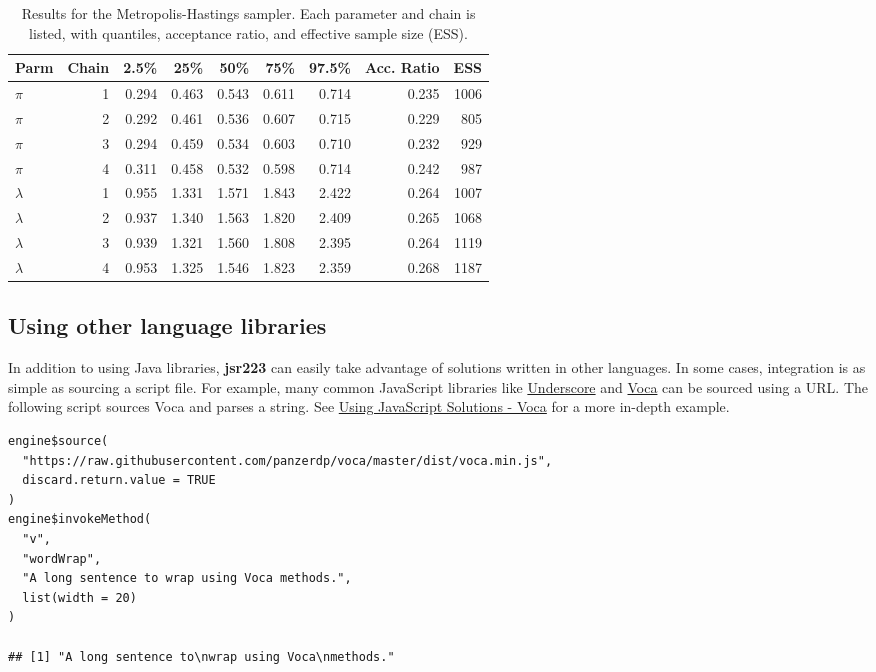 \documentclass[
article,
11pt, %
a4paper, %
oneside, %
headinclude,footinclude, %
]{scrartcl}
\theoremstyle{definition} %
\theoremstyle{plain} %
\theoremstyle{remark} %
\newcommand{\pkg}[1]{\textbf{#1}}
\begin{document}
\begin{table}[h]
\centering
\caption{Results for the Metropolis-Hastings sampler. Each parameter and chain is listed, with quantiles, acceptance ratio, and effective sample size (ESS).}
\label{tab:mcmcx}
\begin{tabular}{lrrrrrrrr}
\hline
Parm & Chain & 2.5\% & 25\% & 50\% & 75\% & 97.5\% & Acc. Ratio & ESS \\ 
\hline
$\pi$ &    1 & 0.294 & 0.463 & 0.543 & 0.611 & 0.714 & 0.235 & 1006 \\ 
$\pi$ &    2 & 0.292 & 0.461 & 0.536 & 0.607 & 0.715 & 0.229 &  805 \\ 
$\pi$ &    3 & 0.294 & 0.459 & 0.534 & 0.603 & 0.710 & 0.232 &  929 \\ 
$\pi$ &    4 & 0.311 & 0.458 & 0.532 & 0.598 & 0.714 & 0.242 &  987 \\ 
$\lambda$ &    1 & 0.955 & 1.331 & 1.571 & 1.843 & 2.422 & 0.264 & 1007 \\ 
$\lambda$ &    2 & 0.937 & 1.340 & 1.563 & 1.820 & 2.409 & 0.265 & 1068 \\ 
$\lambda$ &    3 & 0.939 & 1.321 & 1.560 & 1.808 & 2.395 & 0.264 & 1119 \\ 
$\lambda$ &    4 & 0.953 & 1.325 & 1.546 & 1.823 & 2.359 & 0.268 & 1187 \\ 
\hline
\end{tabular}
\label{tab:mcmcx}
\end{table}

\subsection{Using other language libraries} %

In addition to using Java libraries, \pkg{jsr223} can easily take advantage of solutions written in other languages. In some cases, integration is as simple as sourcing a script file. For example, many common JavaScript libraries like \href{http://underscorejs.org/}{Underscore} and \href{https://vocajs.com/}{Voca} can be sourced using a URL. The following script sources Voca and parses a string. See \hyperlink{using-javascript-solutions-voca}{Using JavaScript Solutions - Voca} for a more in-depth example.

\begin{verbatim}
engine$source(
  "https://raw.githubusercontent.com/panzerdp/voca/master/dist/voca.min.js",
  discard.return.value = TRUE
)
engine$invokeMethod(
  "v", 
  "wordWrap", 
  "A long sentence to wrap using Voca methods.", 
  list(width = 20)
)

## [1] "A long sentence to\nwrap using Voca\nmethods."
\end{verbatim}
\end{document}
